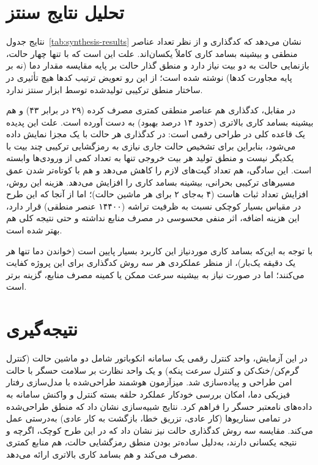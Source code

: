 \documentclass[11pt,a4paper]{article}
\begin{document}
\section{تحلیل نتایج سنتز}
نتایج جدول~\ref{tab:synthesis-results} نشان می‌دهد که کدگذاری  و  از نظر تعداد عناصر منطقی و بیشینه بسامد کاری کاملاً یکسان‌اند. علت این است که با تنها چهار حالت، بازنمایی حالت به دو بیت نیاز دارد و منطق گذار حالت بر پایه مقایسه مقدار دما (نه بر پایه مجاورت کدها) نوشته شده است؛ از این رو تعویض ترتیب کدها هیچ تأثیری در ساختار منطق ترکیبی تولیدشده توسط ابزار سنتز ندارد.

در مقابل، کدگذاری  هم عناصر منطقی کمتری مصرف کرده (۲۹ در برابر ۴۳) و هم بیشینه بسامد کاری بالاتری (حدود ۱۴ درصد بهبود) به دست آورده است. علت این پدیده یک قاعده کلی در طراحی رقمی  است: در کدگذاری  هر حالت با یک  مجزا نمایش داده می‌شود، بنابراین برای تشخیص حالت جاری نیازی به رمزگشایی ترکیبی چند بیت با یکدیگر نیست و منطق تولید هر بیت خروجی تنها به تعداد کمی از ورودی‌ها وابسته است. این سادگی، هم تعداد گیت‌های لازم را کاهش می‌دهد و هم با کوتاه‌تر شدن عمق مسیرهای ترکیبی بحرانی، بیشینه بسامد کاری را افزایش می‌دهد. هزینه این روش، افزایش تعداد ثبات هاست (۴  به‌جای ۲ برای هر ماشین حالت)؛ اما از آنجا که این طرح در مقیاس بسیار کوچکی نسبت به ظرفیت تراشه (۱۴۴۰۰ عنصر منطقی) قرار دارد، این هزینه اضافه، اثر منفی محسوسی در مصرف منابع نداشته و حتی نتیجه کلی هم بهتر شده است.

با توجه به این‌که بسامد کاری موردنیاز این کاربرد بسیار پایین است (خواندن دما تنها هر یک دقیقه یک‌بار)، از منظر عملکردی هر سه روش کدگذاری برای این پروژه کفایت می‌کنند؛ اما در صورت نیاز به بیشینه سرعت ممکن یا کمینه مصرف منابع،  گزینه برتر است.

\section{نتیجه‌گیری}
در این آزمایش، واحد کنترل رقمی یک سامانه انکوباتور شامل دو ماشین حالت (کنترل گرم‌کن/خنک‌کن و کنترل سرعت پنکه) و یک واحد نظارت بر سلامت حسگر با حالت امن طراحی و پیاده‌سازی شد. میزآزمون هوشمند طراحی‌شده با مدل‌سازی رفتار فیزیکی دما، امکان بررسی خودکار عملکرد حلقه بسته کنترل و واکنش سامانه به داده‌های نامعتبر حسگر را فراهم کرد. نتایج شبیه‌سازی نشان داد که منطق طراحی‌شده در تمامی سناریوها (کار عادی، تزریق خطا، بازگشت به کار عادی) به‌درستی عمل می‌کند. مقایسه سه روش کدگذاری حالت نیز نشان داد که در این طرح کوچک، اگرچه  و  نتیجه یکسانی دارند،  به‌دلیل ساده‌تر بودن منطق رمزگشایی حالت، هم منابع کمتری مصرف می‌کند و هم بسامد کاری بالاتری ارائه می‌دهد.
\end{document}
